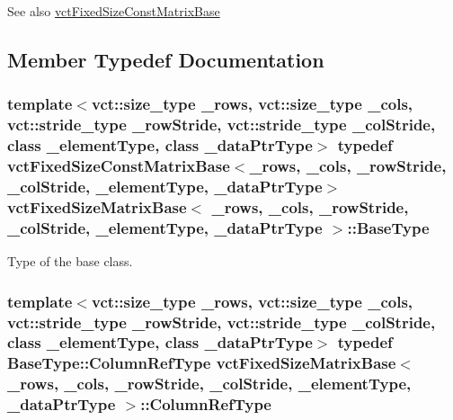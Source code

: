 \begin{DoxySeeAlso}{See also}
\hyperlink{classvct_fixed_size_const_matrix_base}{vct\+Fixed\+Size\+Const\+Matrix\+Base} 
\end{DoxySeeAlso}


\subsection{Member Typedef Documentation}
\hypertarget{classvct_fixed_size_matrix_base_af750de762d865940c9eba155b2e87b9c}{}
\subsubsection[{Base\+Type}]{\setlength{\rightskip}{0pt plus 5cm}template$<$vct\+::size\+\_\+type \+\_\+rows, vct\+::size\+\_\+type \+\_\+cols, vct\+::stride\+\_\+type \+\_\+row\+Stride, vct\+::stride\+\_\+type \+\_\+col\+Stride, class \+\_\+element\+Type, class \+\_\+data\+Ptr\+Type$>$ typedef {\bf vct\+Fixed\+Size\+Const\+Matrix\+Base}$<$\+\_\+rows, \+\_\+cols, \+\_\+row\+Stride, \+\_\+col\+Stride, \+\_\+element\+Type, \+\_\+data\+Ptr\+Type$>$ {\bf vct\+Fixed\+Size\+Matrix\+Base}$<$ \+\_\+rows, \+\_\+cols, \+\_\+row\+Stride, \+\_\+col\+Stride, \+\_\+element\+Type, \+\_\+data\+Ptr\+Type $>$\+::{\bf Base\+Type}}\label{classvct_fixed_size_matrix_base_af750de762d865940c9eba155b2e87b9c}
Type of the base class. \hypertarget{classvct_fixed_size_matrix_base_a59c0bb73e3e0a4d1daea3a017eceaac7}{}
\subsubsection[{Column\+Ref\+Type}]{\setlength{\rightskip}{0pt plus 5cm}template$<$vct\+::size\+\_\+type \+\_\+rows, vct\+::size\+\_\+type \+\_\+cols, vct\+::stride\+\_\+type \+\_\+row\+Stride, vct\+::stride\+\_\+type \+\_\+col\+Stride, class \+\_\+element\+Type, class \+\_\+data\+Ptr\+Type$>$ typedef {\bf Base\+Type\+::\+Column\+Ref\+Type} {\bf vct\+Fixed\+Size\+Matrix\+Base}$<$ \+\_\+rows, \+\_\+cols, \+\_\+row\+Stride, \+\_\+col\+Stride, \+\_\+element\+Type, \+\_\+data\+Ptr\+Type $>$\+::{\bf Column\+Ref\+Type}}\label{classvct_fixed_size_matrix_base_a59c0bb73e3e0a4d1daea3a017eceaac7}
\hypertarget{classvct_fixed_size_matrix_base_a7420316140dde042d228bc02fb98d4a7}{}
